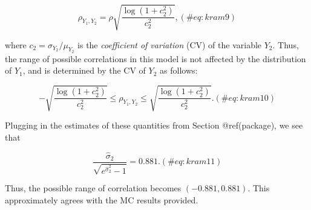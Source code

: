 \documentclass[
]{jss}
\begin{document}
\begin{equation}
\rho_{Y_1, Y_2} = \rho \sqrt{\frac{\log(1+c_2^2)}{c_2^2}},
(\#eq:kram9)
\end{equation}

where \(c_2=\sigma_{Y_2}/\mu_{Y_2}\) is the \emph{coefficient of
variation} (CV) of the variable \(Y_2\). Thus, the range of possible
correlations in this model is not affected by the distribution of
\(Y_1\), and is determined by the CV of \(Y_2\) as follows:

\begin{equation}
- \sqrt{\frac{\log(1+c_2^2)}{c_2^2}} \leq \rho_{Y_1, Y_2} \leq \sqrt{\frac{\log(1+c_2^2)}{c_2^2}}. 
(\#eq:kram10)
\end{equation}

Plugging in the estimates of these quantities from Section
@ref(package), we see that

\begin{equation}
\frac{\hat{\sigma}_2}{\sqrt{e^{\hat{\sigma}_2^2} -1}} = 0.881.
(\#eq:kram11)
\end{equation}

Thus, the possible range of correlation becomes \((-0.881, 0.881)\).
This approximately agrees with the MC results provided.



\end{document}
